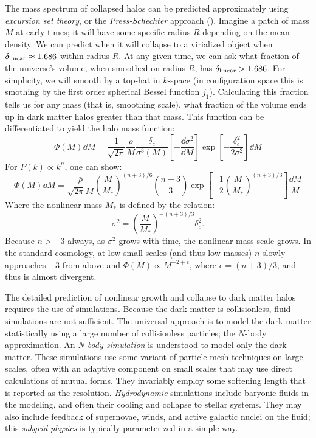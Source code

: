The mass spectrum of collapsed halos can be predicted approximately
using {\it excursion set theory}, or the {\it Press-Schechter}
approach (\citealt{press74a, bond91a, lacey93a}). Imagine a patch of
mass $M$ at early times; it will have some specific radius $R$
depending on the mean density. We can predict when it will collapse to
a virialized object when $\delta_{\rm linear} \approx 1.686$ within
radius $R$. At any given time, we can ask what fraction of the
universe's volume, when smoothed on radius $R$, has $\delta_{\rm
linear} > 1.686$. For simplicity, we will smooth by a top-hat in
$k$-space (in configuration space this is smothing by the first order
spherical Bessel function $j_1$). Calculating this fraction tells us
for any mass (that is, smoothing scale), what fraction of the volume
ends up in dark matter halos greater than that mass. This function can
be differentiated to yield the halo mass function:
\begin{equation}
\Phi(M) \dd M
= \frac{1}{\sqrt{2\pi}} \frac{\bar \rho}{M} \frac{\delta_c}{\sigma^3(M)} \left[
- \frac{\dd \sigma^2}{\dd
M}\right] \exp\left[-\frac{\delta_c^2}{2\sigma^2}\right] \dd M
\end{equation}
For $P(k)\propto k^n$, one can show:
\begin{equation}
\Phi(M) \dd{M} = \frac{\bar\rho}{\sqrt{2\pi}
M} \left(\frac{M}{M_\ast}\right)^{(n+3)/6}
\left(\frac{n+3}{3}\right)
\exp\left[-\frac{1}{2}\left(\frac{M}{M_\ast}\right)^{(n+3)/3}\right] \frac{\dd
M}{M}
\end{equation}
Where the nonlinear mass $M_\ast$ is defined by the relation:
\begin{equation}
\sigma^2 = \left(\frac{M}{M_\ast}\right)^{-(n+3)/3} \delta_c^2.
\end{equation}
Because $n>-3$ always, as $\sigma^2$ grows with time, the nonlinear
mass scale grows.  In the standard cosmology, at low small scales (and
thus low masses) $n$ slowly approaches $-3$ from above and
$\Phi(M) \propto M^{-2 + \epsilon}$, where $\epsilon = (n+3) /3$, and
thus is almost divergent.

The detailed prediction of nonlinear growth and collapse to dark
matter halos requires the use of simulations. Because the dark matter
is collisionless, fluid simulations are not sufficient. The universal
approach is to model the dark matter statistically using a large
number of collisionless particles; the $N$-body approximation. An {\it
N-body simulation} is understood to model only the dark matter. These
simulations use some variant of particle-mesh techniques on large
scales, often with an adaptive component on small scales that may use
direct calculations of mutual forms. They invariably employ some
softening length that is reported as the resolution.  {\it
Hydrodynamic} simulations include baryonic fluids in the modeling, and
often their cooling and collapse to stellar systems. They may also
include feedback of supernovae, winds, and active galactic nuclei on
the fluid; this {\it subgrid physics} is typically parameterized in a
simple way.


